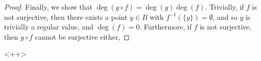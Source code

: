 \documentclass[fontsize=11pt]{scrartcl} %
\numberwithin{equation}{section} %
\numberwithin{figure}{section} %
\numberwithin{table}{section} %
\begin{document}
\begin{proof}
    Finally, we show that $\deg(g\circ f) = \deg(g)\deg(f)$. Trivially, if $f$
    is not surjective, then there exists a point $y\in B$ with $f^{-1}(\{y\}) =
    \emptyset$, and so $y$ is trivially a regular value, and $\deg(f)=0$.
    Furthermore, if $f$ is not surjective, then $g\circ f$ cannot be surjective
    either, 

\end{proof}<++>
\end{document}
